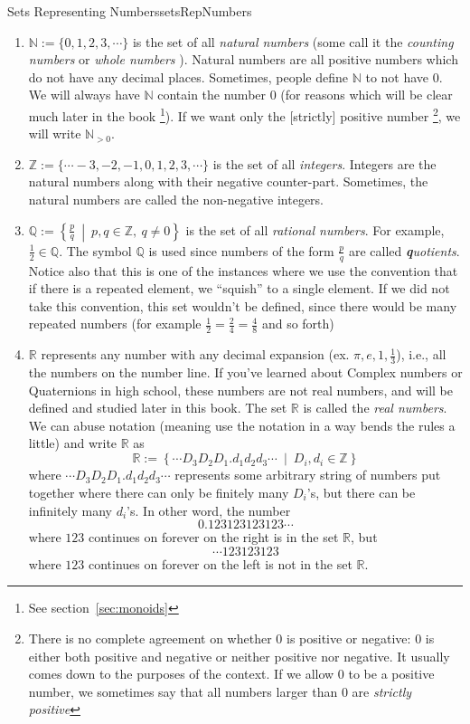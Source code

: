 \documentclass{book}
\newcommand{\N}{{\mathbb{N}}}
\newcommand{\Q}{{\mathbb{Q}}}
\newcommand{\R}{{\mathbb{R}}}
\newcommand{\Z}{{\mathbb{Z}}}
\newcommand{\set}[2]{\left\{#1 \ \middle|\ #2\right\}}
\begin{document}
\begin{defn}[breakable]{Sets Representing Numbers}{setsRepNumbers}
	\begin{enumerate}
		\item $\N := \{0,1,2,3,\cdots\}$ is the set of all \emph{natural numbers} (some call it the \emph{counting numbers}
			or \emph{whole numbers} ). Natural numbers are all positive
			numbers which do not have any decimal places. Sometimes, people define $\N$ to not have $0$. We will always have
			$\N$ contain the number $0$ (for reasons which will be clear much later in the book \footnote{See
				section~\ref{sec:monoids}}). If we want only the [strictly] positive number \footnote{There is no complete agreement on whether
			$0$ is positive or negative: $0$ is either both positive and
		negative or neither positive nor negative. It usually comes down to the purposes of the context. If we allow $0$
	to be a positive number, we sometimes say that all numbers larger than $0$ are \emph{strictly positive}}, we will
	write $\N_{>0}$.
		\item $\Z := \{\cdots -3,-2,-1,0,1,2,3,\cdots\}$ is the set of all \emph{integers}. Integers are the natural
			numbers along with their negative counter-part. Sometimes, the natural numbers are called the non-negative
			integers.
		\item $\Q := \set{ \frac{p}{q} }{ p,q \in \Z,\ q\ne 0 }$ is the set of all \emph{rational numbers}. For example,
			$\frac{1}{2} \in \Q$. The symbol
			$\Q$ is used since numbers of the form $\frac{p}{q}$ are called \emph{\textbf{q}uotients}. Notice also that
			this is one of the instances where we use the convention that if there is a repeated element, we ``squish''
			to a single element. If we did not take this convention, this set wouldn't be defined, since there would be
			many repeated numbers (for example $ \frac{1}{2} = \frac{2}{4} = \frac{4}{8}$ and so forth)
		\item $\R$ represents any number with any decimal expansion (ex. $\pi, e, 1, \frac{1}{3}$), i.e.,
			all the numbers on the number line. If you've learned about Complex numbers or
			Quaternions in high school, these numbers are not real numbers, and will be defined and studied later in this
			book. The set $\R$ is called the \emph{real numbers}. We can abuse notation (meaning use the notation in
			a way bends the rules a little) and write $\R$ as
			\[
				\R := \set{\cdots D_3D_2D_1.d_1d_2d_3\cdots}{D_i, d_i \in \Z}
			\]
			where $\cdots D_3D_2D_1.d_1d_2d_3\cdots$ represents some arbitrary string of numbers put together where there
			can only be finitely many $D_i$'s, but there can be infinitely many $d_i$'s. In other word, the number
			\[
				0.123123123123\cdots
			\]
			where $123$ continues on forever on the right is in the set $\R$, but
			\[
				\cdots123123123
			\]
			where $123$ continues on forever on the left is not in the set $\R$.
	\end{enumerate}
\end{defn}
\end{document}
